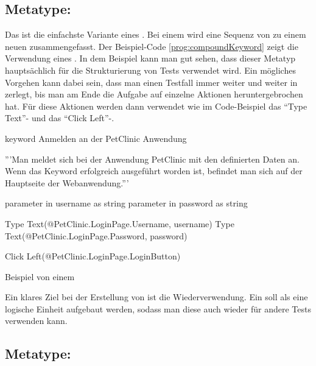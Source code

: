 \subsection{Metatype: }

Das  ist die einfachste Variante eines . Bei einem  wird eine Sequenz von  zu einem neuen  zusammengefasst. Der Beispiel-Code \ref{prog:compoundKeyword} zeigt die Verwendung eines . In dem Beispiel kann man gut sehen, dass dieser Metatyp hauptsächlich für die Strukturierung von Tests verwendet wird. Ein mögliches Vorgehen kann dabei sein, dass man einen Testfall immer weiter und weiter in  zerlegt, bis man am Ende die Aufgabe auf einzelne Aktionen heruntergebrochen hat. Für diese Aktionen werden dann  verwendet wie im Code-Beispiel das "`Type Text"'- und das "`Click Left"'-.

\begin{program}
\begin{JavaCode}
keyword Anmelden an der PetClinic Anwendung{
	'''Man meldet sich bei der Anwendung PetClinic mit den definierten 
	   Daten an. Wenn das Keyword erfolgreich ausgeführt worden ist, 
	   befindet man sich auf der Hauptseite der Webanwendung.'''
	
	parameter in username as string
	parameter in password as string
	
	Type Text(@PetClinic.LoginPage.Username, username)
	Type Text(@PetClinic.LoginPage.Password, password)
	
	Click Left(@PetClinic.LoginPage.LoginButton)
}
\end{JavaCode}
\caption{Beispiel von einem }
\label{prog:compoundKeyword}
\end{program}

\SuperPar
Ein klares Ziel bei der Erstellung von  ist die Wiederverwendung. Ein  soll als eine logische Einheit aufgebaut werden, sodass man diese auch wieder für andere Tests verwenden kann. 


\subsection{Metatype: }


